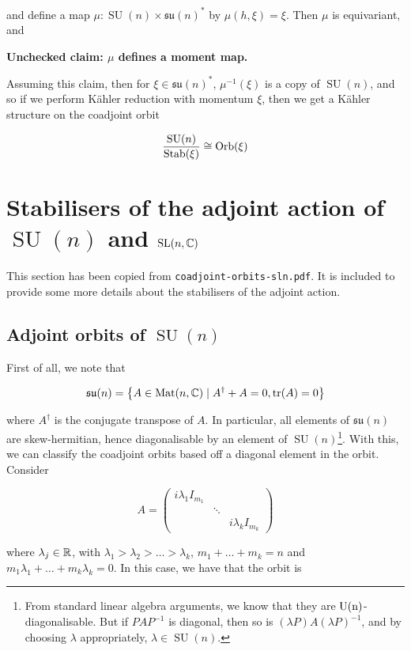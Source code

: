 \documentclass{article}
\DeclareMathOperator{\SU}{SU}
\newcommand{\su}{\mathfrak{su}}
\begin{document}
and define a map \(\mu : \SU(n) \times \su(n)^*\) by \(\mu(h, \xi) = \xi\). Then \(\mu\) is equivariant, and

\textbf{Unchecked claim: \(\mu\) defines a moment map.}

Assuming this claim, then for \(\xi \in \su(n)^*\), \(\mu^{-1}(\xi)\) is a copy of \(\SU(n)\), and so if we perform K\"ahler reduction with momentum \(\xi\), then we get a K\"ahler structure on the coadjoint orbit

\[\frac{\SU(n)}{\Stab(\xi)} \cong \Orb(\xi)\]

\appendix

\section{Stabilisers of the adjoint action of \(\SU(n)\) and \(\operatorname{SL}(n, \mathbb{C})\)}

This section has been copied from \texttt{coadjoint-orbits-sln.pdf}. It is included to provide some more details about the stabilisers of the adjoint action.

\subsection{Adjoint orbits of \(\SU(n)\)}

First of all, we note that

\[\su(n) = \left\{A \in \Mat(n, \C) \mid A^\dagger + A = 0, \tr(A) = 0\right\}\]

where \(A^\dagger\) is the conjugate transpose of \(A\). In particular, all elements of \(\su(n)\) are skew-hermitian, hence diagonalisable by an element of \(\SU(n)\)\footnote{From standard linear algebra arguments, we know that they are \(\rm U(n)\)-diagonalisable. But if \(PAP^{-1}\) is diagonal, then so is \((\lambda P)A(\lambda P)^{-1}\), and by choosing \(\lambda\) appropriately, \(\lambda \in \SU(n)\).}. With this, we can classify the coadjoint orbits based off a diagonal element in the orbit. Consider

\[A = \begin{pmatrix}
    i\lambda_1 I_{m_1} \\
    & \ddots \\
    & & i\lambda_k I_{m_k}
\end{pmatrix}\]

where \(\lambda_j \in \mathbb{R}\), with \(\lambda_1 > \lambda_2 > \dots > \lambda_k\), \(m_1 + \dots + m_k = n\) and \(m_1\lambda_1 + \dots + m_k\lambda_k = 0\). In this case, we have that the orbit is
\end{document}
